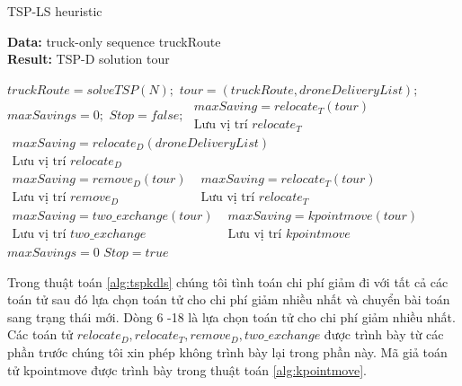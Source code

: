 \documentclass[a4paper,12pt]{report}
\begin{document}
\begin{algorithm}[H]
\caption{TSP-LS heuristic}
\textbf{Data:} truck-only sequence truckRoute\\
\textbf{Result:} TSP-D solution tour
\begin{algorithmic}[1]
\State $truckRoute = solveTSP(N);$
\State $tour = (truckRoute, droneDeliveryList);$
\State $maxSavings = 0;$
\State $Stop = false;$
\Repeat
{}
\State $\begin{array}{l}
maxSaving=relocate_T(tour) \\
\text{Lưu vị trí } relocate_T
\end{array}$
\State $\begin{array}{l}
maxSaving=relocate_D(droneDeliveryList) \\
\text{Lưu vị trí } relocate_D
\end{array}$
\State $\begin{array}{l}
maxSaving=remove_D(tour) \\
\text{Lưu vị trí } remove_D
\end{array}$
\State $\begin{array}{l}
maxSaving=relocate_T(tour) \\
\text{Lưu vị trí } relocate_T
\end{array}$
\State $\begin{array}{l}
maxSaving=two\_exchange(tour) \\
\text{Lưu vị trí } two\_exchange
\end{array}$
\State $\begin{array}{l}
maxSaving=kpointmove(tour) \\
\text{Lưu vị trí } kpointmove
\end{array}$
\EndIf
{} 
\State $maxSavings=0$
\Else 
\State $Stop=true$
\EndIf

\end{algorithmic}
\label{alg:tspkdls}
\end{algorithm}
Trong thuật toán \ref{alg:tspkdls} chúng tôi tình toán chi phí giảm đi với tất cả các toán tử sau đó lựa chọn toán tử cho chi phí giảm nhiều nhất và chuyển bài toán sang trạng thái mới. Dòng 6 -18 là lựa chọn toán tử cho chi phí giảm nhiều nhất. Các toán tử $relocate_D, relocate_T, remove_D, two\_exchange$ được trình bày từ các phần trước chúng tôi xin phép không trình bày lại trong phần này. Mã giả toán tử kpointmove được trình bày trong thuật toán \ref{alg:kpointmove}.
\end{document}
